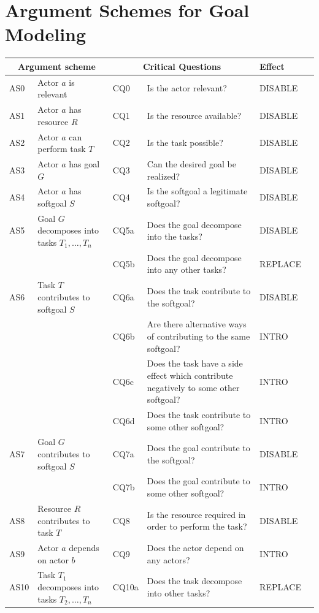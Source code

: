 \section{Argument Schemes for Goal Modeling}
\label{sect:gmas}

\begin{table}[h]
\centering
\begin{tabularx}{\textwidth}{|l|l|l|X|l|l|}
\hline
\multicolumn{2}{|c|}{\textbf{Argument scheme}} & \multicolumn{2}{c|}{\textbf{Critical Questions}} & \textbf{Effect}\\
\hline
AS0 & Actor $a$ is relevant & CQ0 &Is the actor relevant? & DISABLE\\
\hline
AS1 & Actor $a$ has resource $R$ & CQ1 &Is the resource available? & DISABLE\\
\hline
AS2 & Actor $a$ can perform task $T$ & CQ2 &Is the task possible? & DISABLE\\
\hline
AS3 & Actor $a$ has goal $G$ & CQ3 & Can the desired goal be realized? & DISABLE\\
\hline
AS4 & Actor $a$ has softgoal $S$ & CQ4 & Is the softgoal a legitimate softgoal?& DISABLE\\
\hline
\hline
AS5 & Goal $G$ decomposes into tasks $T_1,\ldots,T_n$ & CQ5a & Does the goal decompose into the tasks?& DISABLE\\
& & CQ5b & Does the goal decompose into any other tasks?& REPLACE\\
\hline
AS6 & Task $T$ contributes to softgoal $S$& CQ6a & Does the task contribute to the softgoal?& DISABLE\\
&& CQ6b & Are there alternative ways of contributing to the same softgoal?& INTRO \\
&& CQ6c & Does the task have a side effect which contribute negatively to some other softgoal?& INTRO\\
&& CQ6d & Does the task contribute to some other softgoal?& INTRO\\
\hline
AS7 & Goal $G$ contributes to softgoal $S$ & CQ7a & Does the goal contribute to the softgoal?& DISABLE\\
&& CQ7b & Does the goal contribute to some other softgoal?& INTRO\\
\hline
AS8 & Resource $R$ contributes to task $T$ & CQ8 & Is the resource required in order to perform the task?& DISABLE\\
\hline
AS9 & Actor $a$ depends on actor $b$ & CQ9 & Does the actor depend on any actors?& INTRO\\
\hline
AS10 & Task $T_1$ decomposes into tasks $T_2,\ldots,T_n$ & CQ10a & Does the task decompose into other tasks?& REPLACE\\

\end{tabularx}
\end{table}
